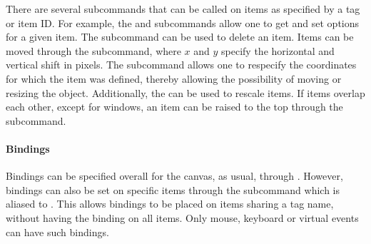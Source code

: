 There are several subcommands that can be called on items as specified
by a tag or item ID. For example, the 
and  subcommands allow one to get
and set options for a given item. The
 subcommand can be used to
delete an item. Items can be moved through the
 subcommand, where $x$
and $y$ specify the horizontal and vertical shift in pixels. The
subcommand 
allows one to respecify the coordinates for which the item was
defined, thereby allowing the possibility of moving or resizing the
object. Additionally, the  can be used to
rescale items. If items overlap each other, except for windows, an
item can be raised to the top through the
 subcommand.



\paragraph{Bindings}
Bindings can be specified overall for the canvas, as usual, through
. However, bindings can also be set on specific items
through the subcommand  which is aliased to . This allows
bindings to be placed on items sharing a tag name, without having the
binding on all items. Only mouse, keyboard or virtual events can have
such bindings.

